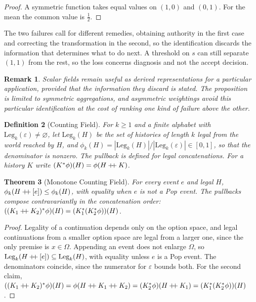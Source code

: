 \documentclass[12pt,oneside,openany]{book}
\theoremstyle{spherepop}
\newtheorem{definition}{Definition}[chapter]
\newtheorem{theorem}[definition]{Theorem}
\theoremstyle{remarkstyle}
\newtheorem{remark}[definition]{Remark}
\newcommand{\hconcat}{\mathbin{+\mkern-5mu+}}
\begin{document}
\begin{proof}
A symmetric function takes equal values on $(1,0)$ and $(0,1)$. For the mean the common value is $\tfrac12$.
\end{proof}

The two failures call for different remedies, obtaining authority in the first case and correcting the transformation in the second, so the identification discards the information that determines what to do next. A threshold on $s$ can still separate $(1,1)$ from the rest, so the loss concerns diagnosis and not the accept decision.

\begin{remark}
Scalar fields remain useful as derived representations for a particular application, provided that the information they discard is stated. The proposition is limited to symmetric aggregations, and asymmetric weightings avoid this particular identification at the cost of ranking one kind of failure above the other.
\end{remark}

\begin{definition}[Counting Field]
For $k\ge1$ and a finite alphabet with $\mathrm{Leg}_k(\varepsilon)\ne\varnothing$, let $\mathrm{Leg}_k(H)$ be the set of histories of length $k$ legal from the world reached by $H$, and $\phi_k(H)=|\mathrm{Leg}_k(H)|/|\mathrm{Leg}_k(\varepsilon)|\in[0,1]$, so that the denominator is nonzero. The pullback is defined for legal concatenations. For a history $K$ write $(K^*\phi)(H)=\phi(H\hconcat K)$.
\end{definition}

\begin{theorem}[Monotone Counting Field]
\label{thm:field-deform}
For every event $e$ and legal $H$, $\phi_k(H\hconcat[e])\le\phi_k(H)$, with equality when $e$ is not a Pop event. The pullbacks compose contravariantly in the concatenation order: $((K_1\hconcat K_2)^*\phi)(H)=(K_1^*(K_2^*\phi))(H)$.
\end{theorem}

\begin{proof}
Legality of a continuation depends only on the option space, and legal continuations from a smaller option space are legal from a larger one, since the only premise is $x\in\Omega$. Appending an event does not enlarge $\Omega$, so $\mathrm{Leg}_k(H\hconcat[e])\subseteq\mathrm{Leg}_k(H)$, with equality unless $e$ is a Pop event. The denominators coincide, since the numerator for $\varepsilon$ bounds both. For the second claim, $((K_1\hconcat K_2)^*\phi)(H)=\phi(H\hconcat K_1\hconcat K_2)=(K_2^*\phi)(H\hconcat K_1)=(K_1^*(K_2^*\phi))(H)$.
\end{proof}
\end{document}
